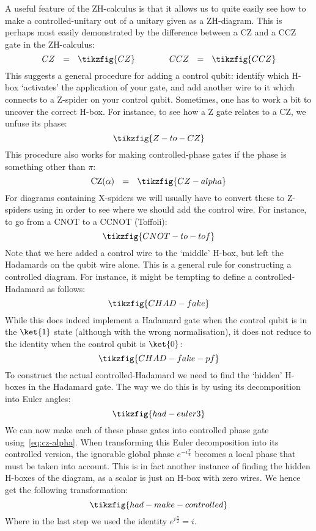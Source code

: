 \documentclass[a4paper,onecolumn,superscriptaddress,11pt,%
				unpublished,%
				allowfontchageintitle,%
				]{quantumarticle}
\begin{document}
A useful feature of the ZH-calculus is that it allows us to quite easily see how to make a controlled-unitary out of a unitary given as a ZH-diagram.
This is perhaps most easily demonstrated by the difference between a CZ and a CCZ gate in the ZH-calculus:
\begin{equation}
	CZ \ \  =\ \  \tikzfig{CZ} \qquad \qquad CCZ \ \ = \ \  \tikzfig{CCZ}
\end{equation}
This suggests a general procedure for adding a control qubit: identify which H-box `activates' the application of your gate, and add another wire to it which connects to a Z-spider on your control qubit.
Sometimes, one has to work a bit to uncover the correct H-box. For instance, to see how a Z gate relates to a CZ, we unfuse its phase:
\begin{equation}
	\tikzfig{Z-to-CZ}
\end{equation}
This procedure also works for making controlled-phase gates if the phase is something other than $\pi$:
\begin{equation}\label{eq:cz-alpha}
	\text{CZ}(\alpha) \ \ = \ \ \tikzfig{CZ-alpha}
\end{equation}
For diagrams containing X-spiders we will usually have to convert these to Z-spiders using \HadamardRule in order to see where we should add the control wire. For instance, to go from a CNOT to a CCNOT (Toffoli):
\begin{equation}
	\tikzfig{CNOT-to-tof}
\end{equation}
Note that we here added a control wire to the `middle' H-box, but left the Hadamards on the qubit wire alone. This is a general rule for constructing a controlled diagram. 
For instance, it might be tempting to define a controlled-Hadamard as follows:
\begin{equation}
	\tikzfig{CHAD-fake}
\end{equation}
While this does indeed implement a Hadamard gate when the control qubit is in the $\ket{1}$ state (although with the wrong normalisation), it does not reduce to the identity when the control qubit is $\ket{0}$:
\begin{equation}
	\tikzfig{CHAD-fake-pf}
\end{equation}
To construct the actual controlled-Hadamard we need to find the `hidden' H-boxes in the Hadamard gate. The way we do this is by using its decomposition into Euler angles:
\begin{equation}\label{eq:had-euler3}
	\tikzfig{had-euler3}
\end{equation}
We can now make each of these phase gates into controlled phase gate using~\eqref{eq:cz-alpha}. 
When transforming this Euler decomposition into its controlled version, the ignorable global phase $e^{-i\frac{\pi}{4}}$ becomes a local phase that must be taken into account. This is in fact another instance of finding the hidden H-boxes of the diagram, as a scalar is just an H-box with zero wires.
We hence get the following transformation:
\begin{equation}\label{eq:had-make-controlled}
	\tikzfig{had-make-controlled}
\end{equation}
Where in the last step we used the identity $e^{i\frac\pi2} = i$.
\end{document}
